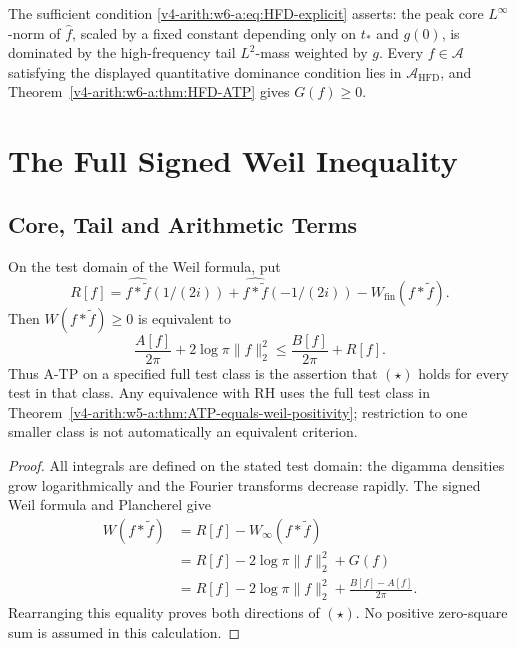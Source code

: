 \begin{remark}[interpretation]
\label{v4-arith:w6-a:rem:HFD-interpretation}
The sufficient condition \eqref{v4-arith:w6-a:eq:HFD-explicit}
asserts: the peak core \(L^{\infty}\)-norm of \(\widehat{f}\), scaled by
a fixed constant depending only on \(t_{\ast}\) and \(g(0)\), is
dominated by the high-frequency tail \(L^{2}\)-mass weighted by \(g\).
Every \(f\in\mathscr A\) satisfying the displayed quantitative
dominance condition lies in \(\mathscr A_{\mathrm{HFD}}\), and
Theorem~\ref{v4-arith:w6-a:thm:HFD-ATP} gives \(G(f)\geq 0\).
\end{remark}

\section{The Full Signed Weil Inequality}
\label{v4-arith:w6-a:bounded-interval}

\subsection{Core, Tail and Arithmetic Terms}
\label{v4-arith:w6-a:bounded-interval:reduction}

\begin{theorem}
\label{v4-arith:w6-a:thm:bounded-reduction}
On the test domain of the Weil formula, put
\begin{equation}
\label{v4-arith:w6-a:eq:R-definition}
R[f]=\widehat{f*\widetilde f}(1/(2i))
 +\widehat{f*\widetilde f}(-1/(2i))-W_{\mathrm{fin}}(f*\widetilde f).
\end{equation}
Then \(W(f*\widetilde f)\geq0\) is equivalent to
\begin{equation}
\label{v4-arith:w6-a:eq:bounded-reduction-star}
\frac{A[f]}{2\pi}+2\log\pi\|f\|_2^2
 \leq \frac{B[f]}{2\pi}+R[f].
\tag{\(\star\)}
\end{equation}
Thus A-TP on a specified full test class is the assertion that
\((\star)\) holds for every test in that class. Any equivalence with
RH uses the full test class in
Theorem~\ref{v4-arith:w5-a:thm:ATP-equals-weil-positivity}; restriction
to one smaller class is not automatically an equivalent criterion.
\end{theorem}

\begin{proof}
All integrals are defined on the stated test domain: the digamma
densities grow logarithmically and the Fourier transforms decrease
rapidly. The signed Weil formula and Plancherel give
\begin{equation}
\label{v4-arith:w6-a:eq:weil-rearranged}
\begin{split}
W(f*\widetilde f)
 &=R[f]-W_\infty(f*\widetilde f)\\
 &=R[f]-2\log\pi\|f\|_2^2+G(f)\\
 &=R[f]-2\log\pi\|f\|_2^2+\frac{B[f]-A[f]}{2\pi}.
\end{split}
\end{equation}
Rearranging this equality proves both directions of \((\star)\).
No positive zero-square sum is assumed in this calculation.
\end{proof}


